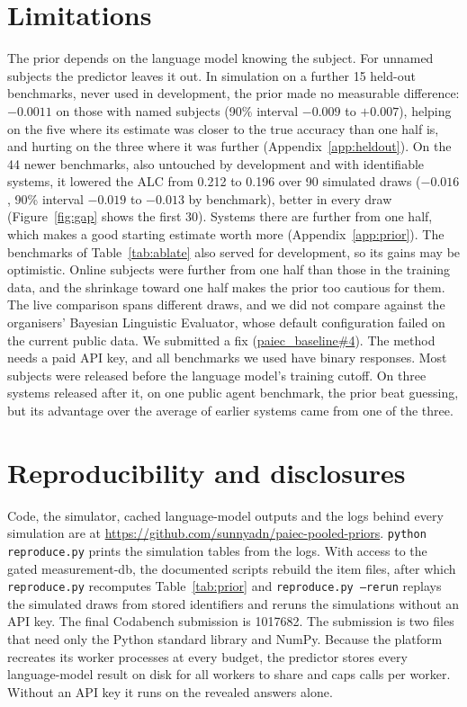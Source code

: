 \documentclass{article}
\begin{document}
\section{Limitations}
\label{sec:limits}

The prior depends on the language model knowing the subject. For unnamed subjects the predictor leaves it out. In simulation on a further 15 held-out benchmarks, never used in development, the prior made no measurable difference: $-0.0011$ on those with named subjects (90\% interval $-0.009$ to $+0.007$), helping on the five where its estimate was closer to the true accuracy than one half is, and hurting on the three where it was further (Appendix~\ref{app:heldout}). On the 44 newer benchmarks, also untouched by development and with identifiable systems, it lowered the ALC from 0.212 to 0.196 over 90 simulated draws ($-0.016$, 90\% interval $-0.019$ to $-0.013$ by benchmark), better in every draw (Figure~\ref{fig:gap} shows the first 30). Systems there are further from one half, which makes a good starting estimate worth more (Appendix~\ref{app:prior}). The benchmarks of Table~\ref{tab:ablate} also served for development, so its gains may be optimistic. Online subjects were further from one half than those in the training data, and the shrinkage toward one half makes the prior too cautious for them. The live comparison spans different draws, and we did not compare against the organisers' Bayesian Linguistic Evaluator, whose default configuration failed on the current public data. We submitted a fix (\href{https://github.com/aims-foundations/paiec_baseline/pull/4}{paiec\_baseline\#4}). The method needs a paid API key, and all benchmarks we used have binary responses. Most subjects were released before the language model's training cutoff. On three systems released after it, on one public agent benchmark, the prior beat guessing, but its advantage over the average of earlier systems came from one of the three.

\section{Reproducibility and disclosures}
\label{sec:repro}

Code, the simulator, cached language-model outputs and the logs behind every simulation are at \url{https://github.com/sunnyadn/paiec-pooled-priors}. \texttt{python reproduce.py} prints the simulation tables from the logs. With access to the gated measurement-db, the documented scripts rebuild the item files, after which \texttt{reproduce.py} recomputes Table~\ref{tab:prior} and \texttt{reproduce.py --rerun} replays the simulated draws from stored identifiers and reruns the simulations without an API key. The final Codabench submission is 1017682. The submission is two files that need only the Python standard library and NumPy. Because the platform recreates its worker processes at every budget, the predictor stores every language-model result on disk for all workers to share and caps calls per worker. Without an API key it runs on the revealed answers alone.
\end{document}
